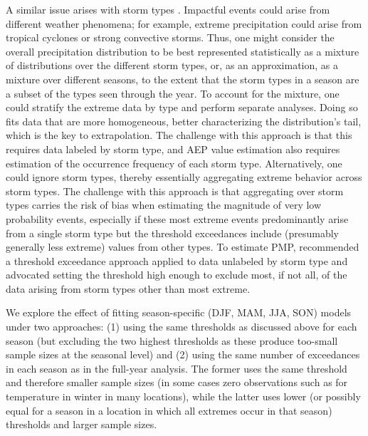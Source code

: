 \documentclass{ametsocV6.1}
\begin{document}
A similar issue arises with storm types \citep{nasem2024pmp}.
Impactful events could arise from different weather phenomena; for example, extreme precipitation could arise from tropical cyclones or strong convective storms. 
Thus, one might consider the overall precipitation distribution to be best represented statistically as a mixture of distributions over the different storm types, or, as an approximation, as a mixture over different seasons, to the extent that the storm types in a season are a subset of the types seen through the year.
To account for the mixture, one could stratify the extreme data by type and perform separate analyses. 
Doing so fits data that are more homogeneous, better characterizing the distribution's tail, which is the key to extrapolation. 
The challenge with this approach is that this requires data labeled by storm type, and AEP value estimation also requires estimation of the occurrence frequency of each storm type.
Alternatively, one could ignore storm types, thereby essentially aggregating extreme behavior across storm types.
The challenge with this approach is that aggregating over storm types carries the risk of bias when estimating the magnitude of very low probability events, especially if these most extreme events predominantly arise from a single storm type but the threshold exceedances include (presumably generally less extreme) values from other types.
To estimate PMP, \citet{nasem2024pmp} recommended a threshold exceedance approach applied to data unlabeled by storm type and advocated setting the threshold high enough to exclude most, if not all, of the data arising from storm types other than most extreme.
 



We explore the effect of fitting season-specific (DJF, MAM, JJA, SON) models under two approaches: (1) using the same thresholds as discussed above for each season (but excluding the two highest thresholds as these produce too-small sample sizes at the seasonal level) %
and (2) using the same number of exceedances in each season as in the full-year analysis. The former uses the same threshold and therefore smaller sample sizes (in some cases zero observations such as for temperature in winter in many locations), while the latter uses lower (or possibly equal for a season in a location in which all extremes occur in that season) thresholds and larger sample sizes.
\end{document}
